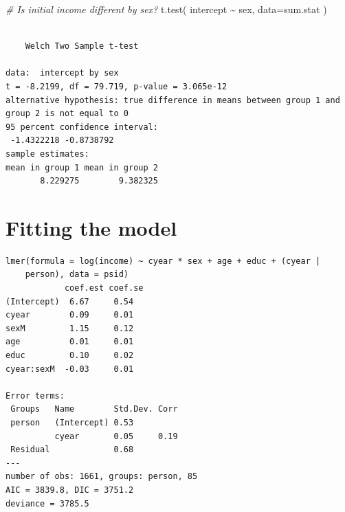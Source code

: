 \documentclass[
  letterpaper,
  DIV=11,
  numbers=noendperiod]{scrreprt}
\newenvironment{Shaded}{\begin{snugshade}}{\end{snugshade}}
\newcommand{\AttributeTok}[1]{\textcolor[rgb]{0.49,0.56,0.16}{#1}}
\newcommand{\CommentTok}[1]{\textcolor[rgb]{0.38,0.63,0.69}{\textit{#1}}}
\newcommand{\DecValTok}[1]{\textcolor[rgb]{0.25,0.63,0.44}{#1}}
\newcommand{\FunctionTok}[1]{\textcolor[rgb]{0.02,0.16,0.49}{#1}}
\newcommand{\NormalTok}[1]{\textcolor[rgb]{0.00,0.44,0.13}{#1}}
\newcommand{\OtherTok}[1]{\textcolor[rgb]{0.00,0.44,0.13}{#1}}
\newcommand{\SpecialCharTok}[1]{\textcolor[rgb]{0.25,0.44,0.63}{#1}}
\begin{document}
\begin{Shaded}
\begin{Highlighting}[]
\CommentTok{\# Is initial income different by sex?}
\FunctionTok{t.test}\NormalTok{( intercept }\SpecialCharTok{\textasciitilde{}}\NormalTok{ sex, }\AttributeTok{data=}\NormalTok{sum.stat )}
\end{Highlighting}
\end{Shaded}

\begin{verbatim}

    Welch Two Sample t-test

data:  intercept by sex
t = -8.2199, df = 79.719, p-value = 3.065e-12
alternative hypothesis: true difference in means between group 1 and group 2 is not equal to 0
95 percent confidence interval:
 -1.4322218 -0.8738792
sample estimates:
mean in group 1 mean in group 2 
       8.229275        9.382325 
\end{verbatim}

\hypertarget{fitting-the-model}{%
\section{Fitting the model}\label{fitting-the-model}}

\begin{Shaded}
\end{Shaded}

\begin{verbatim}
lmer(formula = log(income) ~ cyear * sex + age + educ + (cyear | 
    person), data = psid)
            coef.est coef.se
(Intercept)  6.67     0.54  
cyear        0.09     0.01  
sexM         1.15     0.12  
age          0.01     0.01  
educ         0.10     0.02  
cyear:sexM  -0.03     0.01  

Error terms:
 Groups   Name        Std.Dev. Corr 
 person   (Intercept) 0.53          
          cyear       0.05     0.19 
 Residual             0.68          
---
number of obs: 1661, groups: person, 85
AIC = 3839.8, DIC = 3751.2
deviance = 3785.5 
\end{verbatim}
\end{document}
